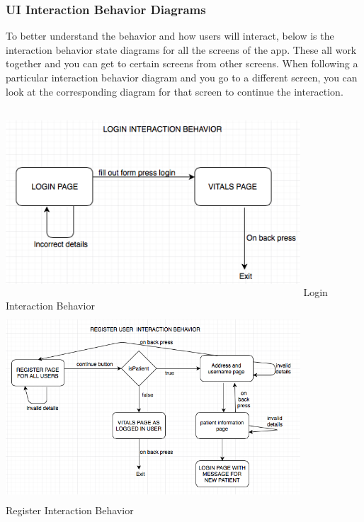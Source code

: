 \subsubsection{UI Interaction Behavior Diagrams}
     To better understand the behavior and how users will interact, below is the interaction behavior state diagrams for all the screens of the app. These all work together and you can get to certain screens from other screens. When following a particular interaction behavior diagram and you go to a different screen, you can look at the corresponding diagram for that screen to continue the interaction. 
\begin{center}

\includegraphics[width=11cm, height=7cm]{Diagrams/loginIB.png}
Login Interaction Behavior
\\

\includegraphics[width=11cm, height=7cm]{Diagrams/registerIB.png}
\\
Register Interaction Behavior
\\


\end{center}
